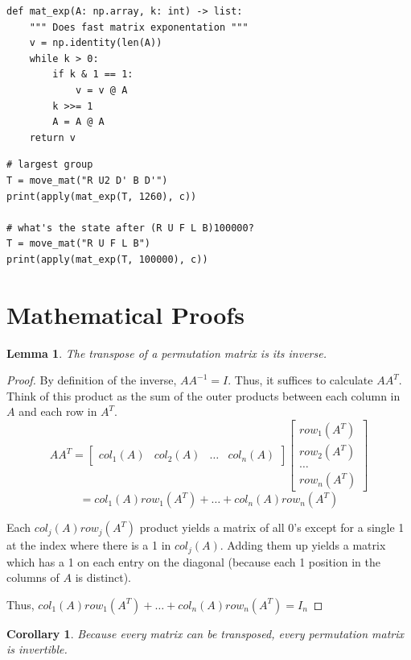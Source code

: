 \documentclass[11pt, oneside]{article}
\theoremstyle{plain}
\newtheorem{corollary}{Corollary}[theorem]
\newtheorem{lemma}[theorem]{Lemma}
\begin{document}
\begin{verbatim}
def mat_exp(A: np.array, k: int) -> list:
    """ Does fast matrix exponentation """
    v = np.identity(len(A))
    while k > 0:
        if k & 1 == 1:
            v = v @ A
        k >>= 1
        A = A @ A
    return v
\end{verbatim}

\begin{verbatim}
# largest group
T = move_mat("R U2 D' B D'")
print(apply(mat_exp(T, 1260), c))

# what's the state after (R U F L B)100000?
T = move_mat("R U F L B")
print(apply(mat_exp(T, 100000), c))
\end{verbatim}

\section{Mathematical Proofs}

\begin{lemma}
The transpose of a permutation matrix is its inverse.
\end{lemma}

\begin{proof}
By definition of the inverse, \( A A^{-1} = I \).
Thus, it suffices to calculate \( AA^T \).
Think of this product as the sum of the outer products between
each column in \( A \) and each row in \( A^T \).
\[ AA^T = \begin{bmatrix} col_1(A) & col_2(A) & \dots & col_n(A) \end{bmatrix}
\begin{bmatrix} row_1(A^T) \\ row_2(A^T) \\ \dots \\ row_n(A^T) \end{bmatrix} \]
\[ = col_1(A) row_1(A^T) + \dots + col_n(A) row_n(A^T) \]

Each \( col_j(A) row_j(A^T) \) product yields a matrix of all 0's except
for a single 1 at the index where there is a 1 in \( col_j(A) \).
Adding them up yields a matrix which has a 1 on each entry on the diagonal (because each 1
position in the columns of \( A \) is distinct).

Thus, \( col_1(A) row_1(A^T) + \dots + col_n(A) row_n(A^T) = I_n \)
\end{proof}

\begin{corollary}
Because every matrix can be transposed, every permutation matrix is invertible.
\end{corollary}
\end{document}
